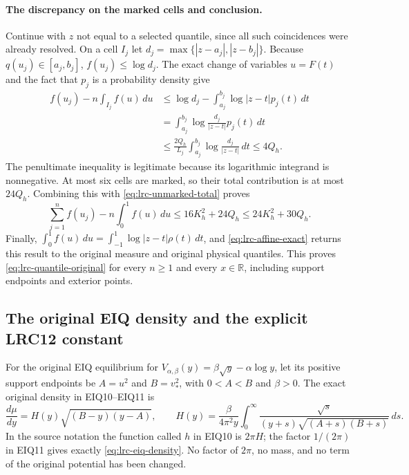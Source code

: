 \paragraph{The discrepancy on the marked cells and conclusion.}
Continue with $z$ not equal to a selected quantile, since all such
coincidences were already resolved. On a cell $I_j$ let
$d_j=\max\{|z-a_j|,|z-b_j|\}$. Because $q(u_j)\in[a_j,b_j]$,
$f(u_j)\leq\log d_j$. The exact change of variables $u=F(t)$ and
the fact that $p_j$ is a probability density give
\[
 \begin{split}
 f(u_j)-n\int_{I_j}f(u)\,du
 &\leq\log d_j-\int_{a_j}^{b_j}\log|z-t|p_j(t)\,dt\\
 &=\int_{a_j}^{b_j}\log\frac{d_j}{|z-t|}p_j(t)\,dt\\
 &\leq\frac{2Q_h}{L_j}
             \int_{a_j}^{b_j}\log\frac{d_j}{|z-t|}\,dt
 \leq4Q_h.
 \end{split}
\]
The penultimate inequality is legitimate because its logarithmic
integrand is nonnegative. At most six cells are marked, so their
total contribution is at most $24Q_h$. Combining this with
\eqref{eq:lrc-unmarked-total} proves
\[
 \sum_{j=1}^nf(u_j)-n\int_0^1f(u)\,du
 \leq16K_h^2+24Q_h\leq24K_h^2+30Q_h.
\]
Finally,
$\int_0^1f(u)\,du=\int_{-1}^1\log|z-t|\rho(t)\,dt$,
and \eqref{eq:lrc-affine-exact} returns this result to the original
measure and original physical quantiles. This proves
\eqref{eq:lrc-quantile-original} for every $n\geq1$ and every
$x\in\mathbb R$, including support endpoints and exterior points.

\subsection{The original EIQ density and the explicit LRC12 constant}

For the original EIQ equilibrium for
$V_{\alpha,\beta}(y)=\beta\sqrt y-\alpha\log y$, let its positive
support endpoints be $A=u^2$ and $B=v_*^2$, with $0<A<B$ and
$\beta>0$. The exact original density in EIQ10--EIQ11 is
\begin{equation}\label{eq:lrc-eiq-density}
 \frac{d\mu}{dy}=H(y)\sqrt{(B-y)(y-A)},\qquad
 H(y)=\frac{\beta}{4\pi^2y}
       \int_0^\infty
       \frac{\sqrt s}{(y+s)\sqrt{(A+s)(B+s)}}\,ds.
\end{equation}
In the source notation the function called $h$ in EIQ10 is
$2\pi H$; the factor $1/(2\pi)$ in EIQ11 gives exactly
\eqref{eq:lrc-eiq-density}. No factor of $2\pi$, no mass, and no
term of the original potential has been changed.

